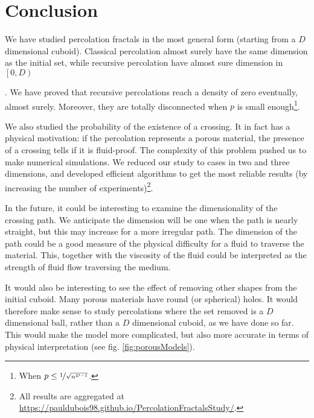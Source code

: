 \section{Conclusion}
We have studied percolation fractals in the most general form (starting from a $D$ dimensional cuboid).
Classical percolation almost surely have the same dimension as the initial set\footnotemark, while recursive percolation have almost sure dimension in $\left[ 0, D \right)$
\addtocounter{footnote}{-1}
\footnotemark
{}.
We have proved that recursive percolations reach a density of zero eventually, almost surely.
Moreover, they are totally disconnected when $p$ is small enough\footnote{When $p \leq \nicefrac{1}{\sqrt{n^{D-1}}}$.}.

We also studied the probability of the existence of a crossing.
It in fact has a physical motivation: if the percolation represents a porous material, the presence of a crossing tells if it is fluid-proof.
The complexity of this problem pushed us to make numerical simulations.
We reduced our study to cases in two and three dimensions, and developed efficient algorithms to get the most reliable results (by increasing the number of experiments)\footnote{All results are aggregated at \url{https://pauldubois98.github.io/PercolationFractalsStudy/}.}.

In the future, it could be interesting to examine the dimensionality of the crossing path.
We anticipate the dimension will be one when the path is nearly straight, but this may increase for a more irregular path.
The dimension of the path could be a good measure of the physical difficulty for a fluid to traverse the material.
This, together with the viscosity of the fluid could be interpreted as the strength of fluid flow traversing the medium.

It would also be interesting to see the effect of removing other shapes from the initial cuboid.
Many porous materials have round (or spherical) holes.
It would therefore make sense to study percolations where the set removed is a $D$ dimensional ball, rather than a $D$ dimensional cuboid, as we have done so far.
This would make the model more complicated, but also more accurate in terms of physical interpretation (see fig. \ref{fig:porousModels}).

